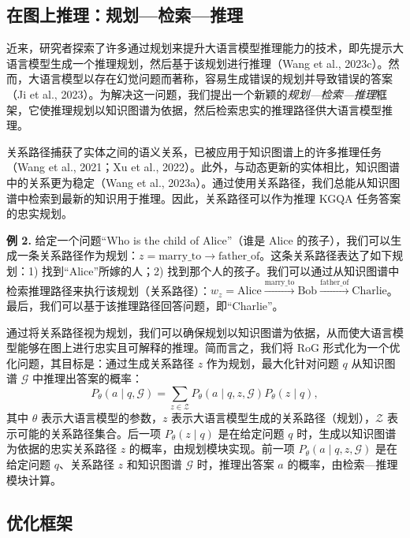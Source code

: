 \documentclass[11pt,UTF8,fontset=fandol]{ctexart}
\begin{document}
\subsection{在图上推理：规划—检索—推理}

近来，研究者探索了许多通过规划来提升大语言模型推理能力的技术，即先提示大语言模型生成一个推理规划，然后基于该规划进行推理（Wang et al., 2023c）。然而，大语言模型以存在幻觉问题而著称，容易生成错误的规划并导致错误的答案（Ji et al., 2023）。为解决这一问题，我们提出一个新颖的\emph{规划—检索—推理}框架，它使推理规划以知识图谱为依据，然后检索忠实的推理路径供大语言模型推理。

关系路径捕获了实体之间的语义关系，已被应用于知识图谱上的许多推理任务（Wang et al., 2021；Xu et al., 2022）。此外，与动态更新的实体相比，知识图谱中的关系更为稳定（Wang et al., 2023a）。通过使用关系路径，我们总能从知识图谱中检索到最新的知识用于推理。因此，关系路径可以作为推理 KGQA 任务答案的忠实规划。

\textbf{例 2.} 给定一个问题“Who is the child of Alice”（谁是 Alice 的孩子），我们可以生成一条关系路径作为规划：$z = \text{marry\_to} \rightarrow \text{father\_of}$。这条关系路径表达了如下规划：1) 找到“Alice”所嫁的人；2) 找到那个人的孩子。我们可以通过从知识图谱中检索推理路径来执行该规划（关系路径）：$w_z = \text{Alice} \xrightarrow{\text{marry\_to}} \text{Bob} \xrightarrow{\text{father\_of}} \text{Charlie}$。最后，我们可以基于该推理路径回答问题，即“Charlie”。

通过将关系路径视为规划，我们可以确保规划以知识图谱为依据，从而使大语言模型能够在图上进行忠实且可解释的推理。简而言之，我们将 RoG 形式化为一个优化问题，其目标是：通过生成关系路径 $z$ 作为规划，最大化针对问题 $q$ 从知识图谱 $\mathcal{G}$ 中推理出答案的概率：
\begin{equation}
P_\theta(a \mid q, \mathcal{G}) = \sum_{z \in \mathcal{Z}} P_\theta(a \mid q, z, \mathcal{G}) P_\theta(z \mid q),
\end{equation}
其中 $\theta$ 表示大语言模型的参数，$z$ 表示大语言模型生成的关系路径（规划），$\mathcal{Z}$ 表示可能的关系路径集合。后一项 $P_\theta(z \mid q)$ 是在给定问题 $q$ 时，生成以知识图谱为依据的忠实关系路径 $z$ 的概率，由规划模块实现。前一项 $P_\theta(a \mid q, z, \mathcal{G})$ 是在给定问题 $q$、关系路径 $z$ 和知识图谱 $\mathcal{G}$ 时，推理出答案 $a$ 的概率，由检索—推理模块计算。

\subsection{优化框架}
\end{document}
